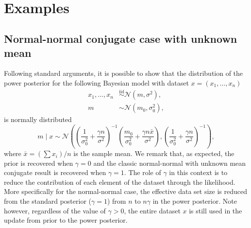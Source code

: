 \documentclass[12pt]{article}
\begin{document}
\section{Examples}

\subsection{Normal-normal conjugate case with unknown mean}
Following standard arguments, it is possible to show that the distribution of
the power posterior for the following Bayesian model with dataset $x = (x_1,
\ldots, x_n)$
\begin{subequations}
\begin{align}
	x_1, \ldots, x_n &\overset{\mathrm{iid}}{\sim} \mathcal{N}(m, \sigma^2), \\
m &\sim \mathcal{N}(m_0, \sigma_0^2),
\end{align}
\end{subequations}
is normally distributed
\begin{equation*}
m \;|\; x \sim \mathcal{N} \left( \left( \frac{1}{\sigma_0^2} + \frac{\gamma n}{\sigma^2} \right)^{-1} \left(\frac{m_0}{\sigma_0^2} + \frac{\gamma n \bar{x}}{\sigma^2}  \right), \left( \frac{1}{\sigma_0^2} + \frac{\gamma n}{\sigma^2} \right)^{-1} \right),
\end{equation*}
where $\bar{x} = (\sum x_i)/ n$ is the sample mean. We remark that, as
expected, the prior is recovered when $\gamma = 0$ and the classic
normal-normal with unknown mean conjugate result is recovered when $\gamma =
1$. The role of $\gamma$ in this context is to reduce the contribution of each
element of the dataset through the likelihood. More specifically for the
normal-normal case, the effective data set size is reduced from the standard
posterior ($\gamma = 1$) from $n$ to $n \gamma$ in the power posterior. Note
however, regardless of the value of $\gamma > 0$, the entire dataset $x$ is
still used in the update from prior to the power posterior.
\end{document}
